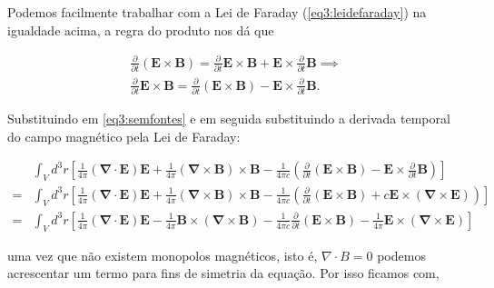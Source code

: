 Podemos facilmente trabalhar com a Lei de Faraday (\ref{eq3:leidefaraday}) na igualdade acima, a regra do produto nos dá que

\begin{equation}
	\begin{split}
		\frac{\partial}{\partial t}\left( \textbf{E} \times \textbf{B}\right) = \frac{\partial}{\partial t}\textbf{E} \times \textbf{B} + \textbf{E} \times \frac{\partial}{\partial t}\textbf{B} \implies \\
		\frac{\partial}{\partial t}\textbf{E} \times \textbf{B} = \frac{\partial}{\partial t}\left( \textbf{E} \times \textbf{B}\right) - \textbf{E} \times \frac{\partial}{\partial t}\textbf{B}.
	\end{split}
\end{equation}

Substituindo em \ref{eq3:semfontes} e em seguida substituindo a derivada temporal do campo magnético pela Lei de Faraday:

\begin{equation}
	\begin{split}
		& \int_V d^3 r \left[ \frac{1}{4\pi}\left( \mathbf{\nabla} \cdot \textbf{E}\right)  \textbf{E} + \frac{1}{4\pi} \left( \mathbf{\nabla} \times \textbf{B}\right) \times \textbf{B} - \frac{1}{4\pi c} \left(\frac{\partial}{\partial t}\left( \textbf{E} \times \textbf{B}\right) - \textbf{E} \times \frac{\partial}{\partial t}\textbf{B}\right) \right]\\
		= & \int_V d^3 r \left[ \frac{1}{4\pi}\left( \mathbf{\nabla} \cdot \textbf{E}\right)  \textbf{E} + \frac{1}{4\pi} \left( \mathbf{\nabla} \times \textbf{B}\right) \times \textbf{B} - \frac{1}{4\pi c} \left(\frac{\partial}{\partial t}\left( \textbf{E} \times \textbf{B}\right) + c\textbf{E} \times (\mathbf{\nabla} \times \textbf{E})\right)\right] \\
		= & \int_V d^3 r \left[ \frac{1}{4\pi}\left( \mathbf{\nabla} \cdot \textbf{E}\right)  \textbf{E} - \frac{1}{4\pi}  \textbf{B} \times \left( \mathbf{\nabla} \times \textbf{B}\right) - \frac{1}{4\pi c} \frac{\partial}{\partial t}\left( \textbf{E} \times \textbf{B}\right) - \frac{1}{4\pi }\textbf{E} \times (\mathbf{\nabla} \times \textbf{E})\right]
	\end{split}
\end{equation}

uma vez que não existem monopolos magnéticos, isto é, $\nabla \cdot B = 0$ podemos acrescentar um termo para fins de simetria da equação. Por isso ficamos com,

